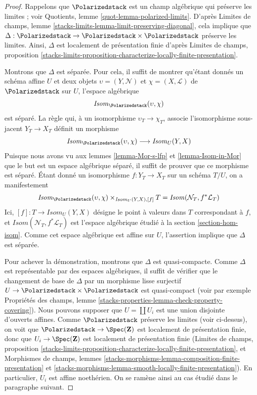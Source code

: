 \begin{proof}
Rappelons que $\Polarizedstack$ est un champ algébrique qui préserve les
limites ; voir Quotients, lemme \ref{quot-lemma-polarized-limits}.
D'après Limites de champs, lemme
\ref{stacks-limits-lemma-limit-preserving-diagonal}, cela implique que
$\Delta : \Polarizedstack \to \Polarizedstack \times \Polarizedstack$
préserve les limites. Ainsi, $\Delta$ est localement de présentation finie
d'après Limites de champs, proposition
\ref{stacks-limits-proposition-characterize-locally-finite-presentation}.

\medskip\noindent
Montrons que $\Delta$ est séparée. Pour cela, il suffit de montrer qu'étant
donnés un schéma affine $U$ et deux objets
$\upsilon = (Y, \mathcal{N})$ et $\chi = (X, \mathcal{L})$
de $\Polarizedstack$ sur $U$, l'espace algébrique
$$
\mathit{Isom}_{\Polarizedstack}(\upsilon, \chi)
$$
est séparé. La règle qui, à un isomorphisme
$\upsilon_T \to \chi_T$, associe l'isomorphisme sous-jacent
$Y_T \to X_T$ définit un morphisme
$$
\mathit{Isom}_{\Polarizedstack}(\upsilon, \chi)
\longrightarrow
\mathit{Isom}_U(Y, X)
$$
Puisque nous avons vu aux lemmes \ref{lemma-Mor-s-lfp} et
\ref{lemma-Isom-in-Mor} que le but est un espace algébrique séparé, il
suffit de prouver que ce morphisme est séparé.
Étant donné un isomorphisme $f : Y_T \to X_T$ sur un schéma $T/U$, on a
manifestement
$$
\mathit{Isom}_{\Polarizedstack}(\upsilon, \chi)
\times_{\mathit{Isom}_U(Y, X), [f]} T
=
\mathit{Isom}(\mathcal{N}_T, f^*\mathcal{L}_T)
$$
Ici, $[f] : T \to \mathit{Isom}_U(Y, X)$ désigne le point à valeurs dans
$T$ correspondant à $f$, et
$\mathit{Isom}(\mathcal{N}_T, f^*\mathcal{L}_T)$ est l'espace algébrique
étudié à la section \ref{section-hom-isom}.
Comme cet espace algébrique est affine sur $U$, l'assertion implique que
$\Delta$ est séparée.

\medskip\noindent
Pour achever la démonstration, montrons que $\Delta$ est quasi-compacte.
Comme $\Delta$ est représentable par des espaces algébriques, il suffit de
vérifier que le changement de base de $\Delta$ par un morphisme lisse
surjectif $U \to \Polarizedstack \times \Polarizedstack$ est quasi-compact
(voir par exemple Propriétés des champs, lemme
\ref{stacks-properties-lemma-check-property-covering}).
Nous pouvons supposer que $U = \coprod U_i$ est une union disjointe
d'ouverts affines. Comme $\Polarizedstack$ préserve les limites (voir
ci-dessus), on voit que
$\Polarizedstack \to \Spec(\mathbf{Z})$ est localement de présentation
finie, donc que $U_i \to \Spec(\mathbf{Z})$ est localement de présentation
finie (Limites de champs, proposition
\ref{stacks-limits-proposition-characterize-locally-finite-presentation},
et Morphismes de champs, lemmes
\ref{stacks-morphisms-lemma-composition-finite-presentation} et
\ref{stacks-morphisms-lemma-smooth-locally-finite-presentation}).
En particulier, $U_i$ est affine noethérien. On se ramène ainsi au cas
étudié dans le paragraphe suivant.


\end{proof}
